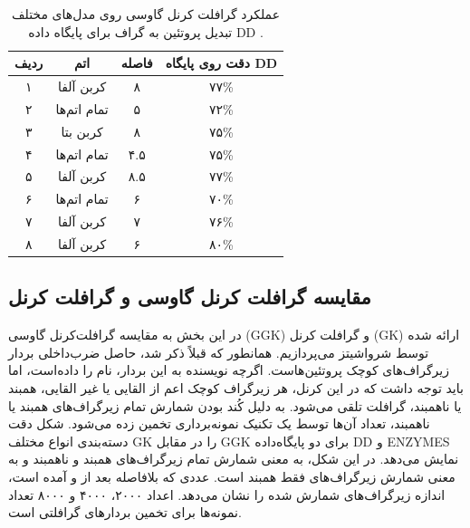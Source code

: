 \begin{table}[ht]
\centering
\begin{tabular}{| c | c | c | c |}
    \hline
    ردیف & اتم & فاصله & دقت روی پایگاه DD \\ \hline
۱ & کربن آلفا & ۸ & ۷۷\% \\ \hline
۲ & تمام اتم‌ها & ۵ & ۷۲\% \\ \hline
۳ & کربن بتا & ۸ & ۷۵\% \\ \hline
۴ & تمام اتم‌ها & ۴.۵ & ۷۵\% \\ \hline
۵ & کربن آلفا & ۸.۵ & ۷۷\% \\ \hline
۶ & تمام اتم‌ها & ۶ & ۷۰\% \\ \hline
۷ & کربن آلفا & ۷ & ۷۶\% \\ \hline
۸ & کربن آلفا & ۶ & ۸۰\% \\ \hline
\end{tabular}
\caption{
عملکرد گرافلت کرنل گاوسی روی مدل‌های مختلف تبدیل پروتئین به گراف برای پایگاه داده DD .
}
\label{tab:ggk-on-rigs}
\end{table}

\subsection{مقایسه گرافلت کرنل گاوسی و گرافلت کرنل}
در این بخش به مقایسه گرافلت‌کرنل گاوسی (GGK) و گرافلت کرنل (GK) ارائه شده توسط شرواشیتز می‌پردازیم. همانطور که قبلاً ذکر شد،  حاصل ضرب‌داخلی بردار زیرگراف‌های کوچک پروتئین‌هاست. اگرچه نویسنده به این بردار، نام  را داده‌است، اما باید توجه داشت که در این کرنل، هر زیرگراف کوچک اعم از القایی یا غیر القایی، همبند یا ناهمبند، گرافلت تلقی می‌شود. به دلیل کُند بودن شمارش تمام زیرگراف‌های همبند یا ناهمبند، تعداد آن‌ها توسط یک تکنیک نمونه‌برداری تخمین زده می‌شود. شکل  دقت دسته‌بندی انواع مختلف GK را در مقابل GGK برای دو پایگاه‌داده DD و ENZYMES نمایش می‌دهد. در این شکل،  به معنی شمارش تمام زیرگراف‌های همبند و ناهمبند و  به معنی شمارش زیرگراف‌های فقط همبند است. عددی که بلافاصله بعد از  و  آمده است، اندازه زیرگراف‌های شمارش شده را نشان می‌دهد. اعداد ۲۰۰۰، ۴۰۰۰ و ۸۰۰۰ تعداد نمونه‌ها برای تخمین بردارهای گرافلتی است.


